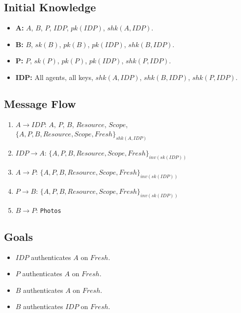 \documentclass[11pt,a4paper]{article}
\begin{document}
\subsection{Initial Knowledge}

\begin{itemize}
  \item \textbf{A:} $A$, $B$, $P$, $\mathit{IDP}$, $\mathit{pk}(\mathit{IDP})$, $shk(A,\mathit{IDP})$.
  \item \textbf{B:} $B$, $\mathit{sk}(B)$, $\mathit{pk}(B)$, $\mathit{pk}(\mathit{IDP})$, $shk(B,\mathit{IDP})$.
  \item \textbf{P:} $P$, $\mathit{sk}(P)$, $\mathit{pk}(P)$, $\mathit{pk}(\mathit{IDP})$, $shk(P,\mathit{IDP})$.
  \item \textbf{IDP:} All agents, all keys, $shk(A,\mathit{IDP})$, $shk(B,\mathit{IDP})$, $shk(P,\mathit{IDP})$.
\end{itemize}

\subsection{Message Flow}

\begin{enumerate}
  \item $A \to \mathit{IDP}$: $A$, $P$, $B$, $\mathit{Resource}$, $\mathit{Scope}$, $\{A, P, B, \mathit{Resource}, \mathit{Scope}, \mathit{Fresh}\}_{shk(A,\mathit{IDP})}$
  \item $\mathit{IDP} \to A$: $\{A, P, B, \mathit{Resource}, \mathit{Scope}, \mathit{Fresh}\}_{\mathit{inv}(\mathit{sk}(\mathit{IDP}))}$
  \item $A \to P$: $\{A, P, B, \mathit{Resource}, \mathit{Scope}, \mathit{Fresh}\}_{\mathit{inv}(\mathit{sk}(\mathit{IDP}))}$
  \item $P \to B$: $\{A, P, B, \mathit{Resource}, \mathit{Scope}, \mathit{Fresh}\}_{\mathit{inv}(\mathit{sk}(\mathit{IDP}))}$
  \item $B \to P$: \texttt{Photos}
\end{enumerate}

\subsection{Goals}

\begin{itemize}
  \item $\mathit{IDP}$ authenticates $A$ on $\mathit{Fresh}$.
  \item $P$ authenticates $A$ on $\mathit{Fresh}$.
  \item $B$ authenticates $A$ on $\mathit{Fresh}$.
  \item $B$ authenticates $\mathit{IDP}$ on $\mathit{Fresh}$.
\end{itemize}
\end{document}

